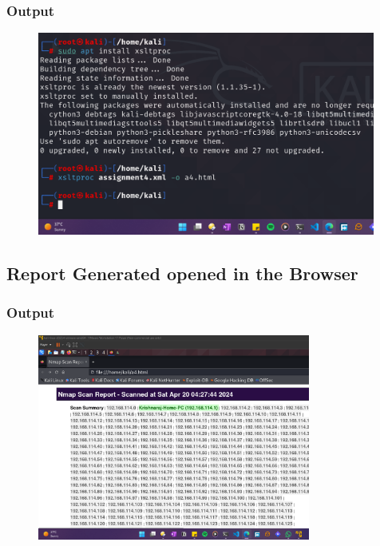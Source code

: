 \documentclass[11pt]{article}
\begin{document}
\subsubsection*{Output}
\begin{figure}[H]
    \centering
    \includegraphics[width=0.99\textwidth]{a4 (4).png}
\end{figure}
\subsection{Report Generated opened in the Browser}

\subsubsection*{Output}
\begin{figure}[H]
    \centering
    \includegraphics[width=0.80\textwidth]{a4 (5).png}
\end{figure}
\end{document}
